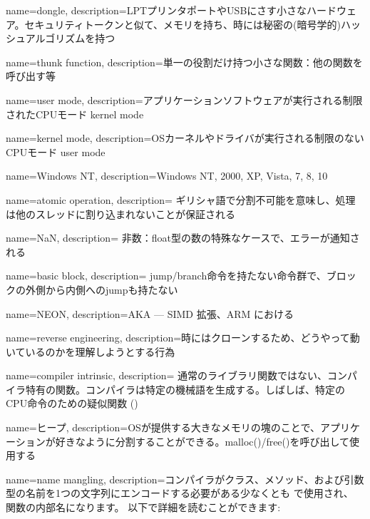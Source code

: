 {
  name=dongle,
  description={LPTプリンタポートやUSBにさす小さなハードウェア。セキュリティトークンと似て、メモリを持ち、時には秘密の(暗号学的)ハッシュアルゴリズムを持つ}
}

{
  name=thunk function,
  description={単一の役割だけ持つ小さな関数：他の関数を呼び出す等}
}

{
  name=user mode,
  description={アプリケーションソフトウェアが実行される制限されたCPUモード \gls{kernel mode}}
}

{
  name=kernel mode,
  description={OSカーネルやドライバが実行される制限のないCPUモード \gls{user mode}}
}

{
  name=Windows NT,
  description={Windows NT, 2000, XP, Vista, 7, 8, 10}
}

{
  name=atomic operation,
  description={
  ギリシャ語で分割不可能を意味し、処理は他のスレッドに割り込まれないことが保証される
  }
}

{
  name=NaN,
  description=
    {非数：float型の数の特殊なケースで、エラーが通知される}
}

{
  name=basic block,
  description=
    {jump/branch命令を持たない命令群で、ブロックの外側から内側へのjumpも持たない}
}

{
  name=NEON,
  description={\ac{AKA}  --- \ac{SIMD} 拡張、ARM における}
}

{
  name=reverse engineering,
  description={時にはクローンするため、どうやって動いているのかを理解しようとする行為}
}

{
  name=compiler intrinsic,
  description={
    通常のライブラリ関数ではない、コンパイラ特有の関数。コンパイラは特定の機械語を生成する。しばしば、特定のCPU命令のための疑似関数 ()
  }
}

{
  name=ヒープ,
  description={\ac{OS}が提供する大きなメモリの塊のことで、アプリケーションが好きなように分割することができる。malloc()/free()を呼び出して使用する}
}

{
  name=name mangling,
  description={コンパイラがクラス、メソッド、および引数型の名前を1つの文字列にエンコードする必要がある少なくとも \CCpp で使用され、
  関数の内部名になります。 以下で詳細を読むことができます: }
}

